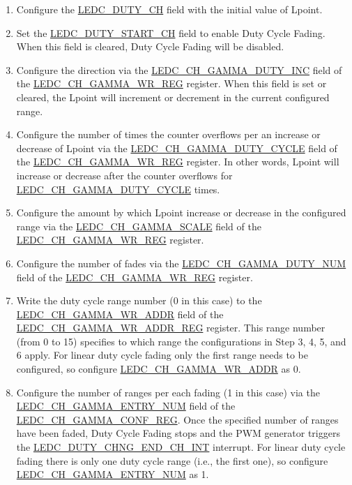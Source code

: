 \documentclass[main\_\_EN.tex]{subfiles}
\begin{document}
\begin{enumerate}
    \item Configure the \hyperref[fielddesc:LEDCDUTYCHN]{LEDC\_DUTY\_CH} field with the initial value of Lpoint.
    \item Set the \hyperref[fielddesc:LEDCDUTYSTARTCHN]{LEDC\_DUTY\_START\_CH} field to enable Duty Cycle Fading. When this field is cleared, Duty Cycle Fading will be disabled.
    \item Configure the direction via the \hyperref[fielddesc:LEDCCHNGAMMADUTYINC]{LEDC\_CH\_GAMMA\_DUTY\_INC} field of the \hyperref[regdesc:LEDCCHNGAMMAWRREG]{LEDC\_CH\_GAMMA\_WR\_REG} register. When this field is set or cleared, the Lpoint will increment or decrement in the current configured range.
    \item Configure the number of times the counter overflows per an increase or decrease of Lpoint via the \hyperref[fielddesc:LEDCCHNGAMMADUTYCYCLE]{LEDC\_CH\_GAMMA\_DUTY\_CYCLE} field of the \hyperref[regdesc:LEDCCHNGAMMAWRREG]{LEDC\_CH\_GAMMA\_WR\_REG} register. In other words, Lpoint will increase or decrease after the counter overflows for \hyperref[fielddesc:LEDCCHNGAMMADUTYCYCLE]{LEDC\_CH\_GAMMA\_DUTY\_CYCLE} times.
    \item Configure the amount by which Lpoint increase or decrease in the configured range via the \hyperref[fielddesc:LEDCCHNGAMMASCALE]{LEDC\_CH\_GAMMA\_SCALE} field of the \hyperref[regdesc:LEDCCHNGAMMAWRREG]{LEDC\_CH\_GAMMA\_WR\_REG} register.
    \item Configure the number of fades via the \hyperref[fielddesc:LEDCCHNGAMMADUTYNUM]{LEDC\_CH\_GAMMA\_DUTY\_NUM} field of the \hyperref[regdesc:LEDCCHNGAMMAWRREG]{LEDC\_CH\_GAMMA\_WR\_REG} register.
    \item Write the duty cycle range number (0 in this case) to the \hyperref[regdesc:LEDCCHNGAMMAWRADDRREG]{LEDC\_CH\_GAMMA\_WR\_ADDR} field of the \hyperref[fielddesc:LEDCCHNGAMMAWRADDR]{LEDC\_CH\_GAMMA\_WR\_ADDR\_REG} register. This range number (from 0 to 15) specifies to which range the configurations in Step 3, 4, 5, and 6 apply. For linear duty cycle fading only the first range needs to be configured, so configure  \hyperref[fielddesc:LEDCCHNGAMMAWRADDR]{LEDC\_CH\_GAMMA\_WR\_ADDR} as 0.
    \item Configure the number of ranges per each fading (1 in this case) via the \hyperref[fielddesc:LEDCCHNGAMMAENTRYNUM]{LEDC\_CH\_GAMMA\_ENTRY\_NUM} field of the \hyperref[regdesc:LEDCCHNGAMMACONFREG]{LEDC\_CH\_GAMMA\_CONF\_REG}. Once the specified number of ranges have been faded, Duty Cycle Fading stops and the PWM generator triggers the \hyperref[int:ledc-duty-chng-end]{LEDC\_DUTY\_CHNG\_END\_CH\_INT} interrupt. For linear duty cycle fading there is only one duty cycle range (i.e., the first one), so configure  \hyperref[fielddesc:LEDCCHNGAMMAENTRYNUM]{LEDC\_CH\_GAMMA\_ENTRY\_NUM} as 1.

\end{enumerate}
\end{document}
